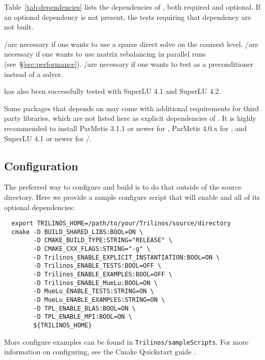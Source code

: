 Table~\ref{tab:dependencies} lists the dependencies of \muelu, both required and
optional. If an optional dependency is not present, the tests requiring that
dependency are not built.

\begin{mycomment}
\amesos/\amesostwo are necessary if one wants to use a sparse direct solve on the coarsest level.
\zoltan/\zoltantwo are necessary if one wants to use matrix rebalancing in parallel runs (see~\S\ref{sec:performance}).
\aztecoo/\belos are necessary if one wants to test \muelu{} as a preconditioner instead of a solver.
\end{mycomment}

\begin{mycomment}
\muelu{} has also been successfully tested with SuperLU 4.1 and SuperLU 4.2.
\end{mycomment}
\begin{mycomment}
Some packages that \muelu{} depends on may come with additional requirements for
third party libraries, which are not listed here as explicit dependencies of \muelu{}.
It is highly recommended to install ParMetis 3.1.1 or newer for \zoltan{},
ParMetis 4.0.x for \zoltantwo{}, and SuperLU 4.1 or newer for
\amesos{}/\amesostwo{}.
\end{mycomment}

\subsection{Configuration}
The preferred way to configure and build \muelu{} is to do that outside of the source directory.
Here we provide a sample configure script that will enable \muelu{} and all of its optional dependencies:
\begin{lstlisting}
  export TRILINOS_HOME=/path/to/your/Trilinos/source/directory
  cmake -D BUILD_SHARED_LIBS:BOOL=ON \
        -D CMAKE_BUILD_TYPE:STRING="RELEASE" \
        -D CMAKE_CXX_FLAGS:STRING="-g" \
        -D Trilinos_ENABLE_EXPLICIT_INSTANTIATION:BOOL=ON \
        -D Trilinos_ENABLE_TESTS:BOOL=OFF \
        -D Trilinos_ENABLE_EXAMPLES:BOOL=OFF \
        -D Trilinos_ENABLE_MueLu:BOOL=ON \
        -D MueLu_ENABLE_TESTS:STRING=ON \
        -D MueLu_ENABLE_EXAMPLES:STRING=ON \
        -D TPL_ENABLE_BLAS:BOOL=ON \
        -D TPL_ENABLE_MPI:BOOL=ON \
        ${TRILINOS_HOME}
\end{lstlisting}

\noindent
More configure examples can be found in \texttt{Trilinos/sampleScripts}.
For more information on configuring, see the \trilinos Cmake Quickstart guide \cite{TrilinosCmakeQuickStart}.

